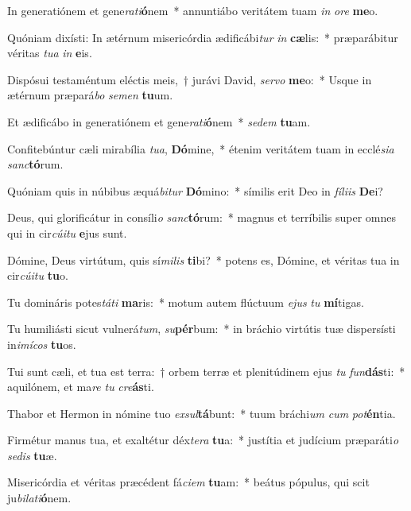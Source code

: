 \item In generatiónem et gene\textit{ra}\textit{ti}\textbf{ó}nem~* annuntiábo veritátem tuam \textit{in} \textit{o}\textit{re} \textbf{me}o.
\item Quóniam dixísti: In ætérnum misericórdia ædificábi\textit{tur} \textit{in} \textbf{cæ}lis:~* præparábitur véritas \textit{tu}\textit{a} \textit{in} \textbf{e}is.
\item Dispósui testaméntum eléctis meis,~† jurávi David, \textit{ser}\textit{vo} \textbf{me}o:~* Usque in ætérnum præpará\textit{bo} \textit{se}\textit{men} \textbf{tu}um.
\item Et ædificábo in generatiónem et gene\textit{ra}\textit{ti}\textbf{ó}nem~* \textit{se}\textit{dem} \textbf{tu}am.
\item Confitebúntur cæli mirabília \textit{tu}\textit{a}, \textbf{Dó}mine,~* étenim veritátem tuam in ecclé\textit{si}\textit{a} \textit{sanc}\textbf{tó}rum.
\item Quóniam quis in núbibus æquá\textit{bi}\textit{tur} \textbf{Dó}mino:~* símilis erit Deo in \textit{fí}\textit{li}\textit{is} \textbf{De}i?
\item Deus, qui glorificátur in consíli\textit{o} \textit{sanc}\textbf{tó}rum:~* magnus et terríbilis super omnes qui in cir\textit{cú}\textit{i}\textit{tu} \textbf{e}jus sunt.
\item Dómine, Deus virtútum, quis sí\textit{mi}\textit{lis} \textbf{ti}bi?~* potens es, Dómine, et véritas tua in cir\textit{cú}\textit{i}\textit{tu} \textbf{tu}o.
\item Tu domináris potes\textit{tá}\textit{ti} \textbf{ma}ris:~* motum autem flúctuum \textit{e}\textit{jus} \textit{tu} \textbf{mí}tigas.
\item Tu humiliásti sicut vulnerá\textit{tum}, \textit{su}\textbf{pér}bum:~* in bráchio virtútis tuæ dispersísti in\textit{i}\textit{mí}\textit{cos} \textbf{tu}os.
\item Tui sunt cæli, et tua est terra:~† orbem terræ et plenitúdinem ejus \textit{tu} \textit{fun}\textbf{dás}ti:~* aquilónem, et ma\textit{re} \textit{tu} \textit{cre}\textbf{ás}ti.
\item Thabor et Hermon in nómine tuo \textit{ex}\textit{sul}\textbf{tá}bunt:~* tuum bráchi\textit{um} \textit{cum} \textit{pot}\textbf{én}tia.
\item Firmétur manus tua, et exaltétur déx\textit{te}\textit{ra} \textbf{tu}a:~* justítia et judícium præparáti\textit{o} \textit{se}\textit{dis} \textbf{tu}æ.
\item Misericórdia et véritas præcédent fá\textit{ci}\textit{em} \textbf{tu}am:~* beátus pópulus, qui scit ju\textit{bi}\textit{la}\textit{ti}\textbf{ó}nem.
